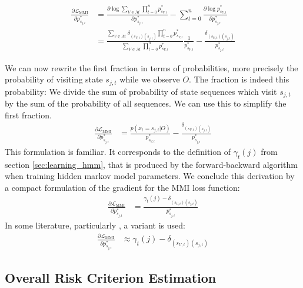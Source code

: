 \begin{align*}
\frac{\partial\mathcal{L}_{\text{MMI}}}{\partial p^*_{s_{j,t}}} &= \frac{\partial \log \sum_{V \in \mathcal{M}} \prod_{t = 0}^{n} p^*_{s_{V,t}}}{\partial p^*_{s_{j,t}}} - \sum_{t = 0}^{n} \frac{\partial \log p^*_{s_{U,t}}}{\partial p^*_{s_{j,t}}} \\
&= \frac{ \sum_{V \in \mathcal{M}} \delta_{(s_{V,t})(s_{j,t})} \prod_{t = 0}^{n} p^*_{s_{V,t}}}{\sum_{V \in \mathcal{M}} \prod_{t = 0}^{n} p^*_{s_{V,t}}}\frac{1}{p^*_{s_{V,t}}} - \frac{\delta_{(s_{U,t})(s_{j,t})}}{p^*_{s_{j,t}}}
\end{align*}

We can now rewrite the first fraction in terms of probabilities, more precisely the probability of visiting state $s_{j,t}$ while we observe $O$. The fraction is indeed this probability: We divide the sum of probability of state sequences which visit $s_{j,t}$ by the sum of the probability of all sequences. We can use this to simplify the first fraction.
\begin{align*}
\frac{\partial\mathcal{L}_{\text{MMI}}}{\partial p^*_{s_{j,t}}} &= \frac{p(x_t = s_{j,t}|O)}{p^*_{s_{V,t}}} - \frac{\delta_{(s_{U,t})(s_{j,t})}}{p^*_{s_{j,t}}}
\end{align*}
This formulation is familiar. It corresponds to the definition of $\gamma_t(j)$ from section \ref{sec:learning_hmm}, that is produced by the forward-backward algorithm when training hidden markov model parameters. We conclude this derivation by a compact formulation of the gradient for the MMI loss function:
\begin{align}
\label{eq:mmi_grad}
\frac{\partial\mathcal{L}_{\text{MMI}}}{\partial p^*_{s_{j,t}}} &=  \frac{\gamma_t(j) -\delta_{(s_{U,t})(s_{j,t})}}{p^*_{s_{j,t}}}
\end{align} 
In some literature, particularly \cite{ghoshal2013sequence}, a variant is used: 
\begin{align}
\label{eq:mmi_grad_simple}
\frac{\partial\mathcal{L}_{\text{MMI}}}{\partial p^*_{s_{j,t}}} &\approx \gamma_t(j) - \delta_{(s_{U,t})(s_{j,t})}
\end{align}

\subsection{Overall Risk Criterion Estimation}

